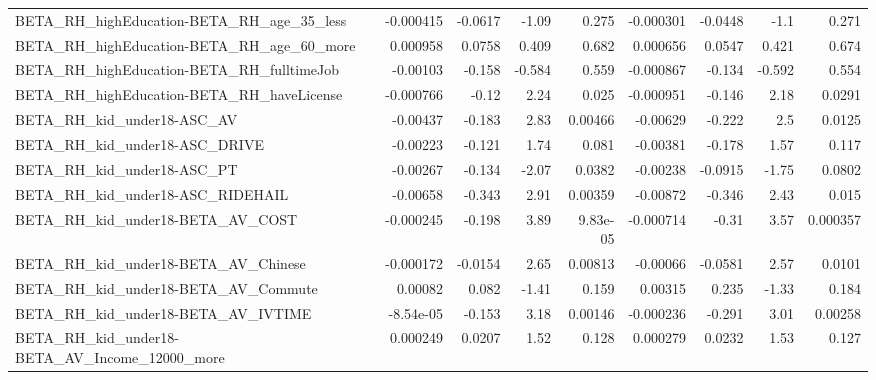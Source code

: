 \begin{tabular}{lrrrrrrrr}
BETA\_RH\_highEducation-BETA\_RH\_age\_35\_less          &   -0.000415 &      -0.0617 &    -1.09 &    0.275 &  -0.000301 &     -0.0448 &         -1.1 &         0.271 \\
BETA\_RH\_highEducation-BETA\_RH\_age\_60\_more          &    0.000958 &       0.0758 &    0.409 &    0.682 &   0.000656 &      0.0547 &        0.421 &         0.674 \\
BETA\_RH\_highEducation-BETA\_RH\_fulltimeJob          &    -0.00103 &       -0.158 &   -0.584 &    0.559 &  -0.000867 &      -0.134 &       -0.592 &         0.554 \\
BETA\_RH\_highEducation-BETA\_RH\_haveLicense          &   -0.000766 &        -0.12 &     2.24 &    0.025 &  -0.000951 &      -0.146 &         2.18 &        0.0291 \\
BETA\_RH\_kid\_under18-ASC\_AV                         &    -0.00437 &       -0.183 &     2.83 &  0.00466 &   -0.00629 &      -0.222 &          2.5 &        0.0125 \\
BETA\_RH\_kid\_under18-ASC\_DRIVE                      &    -0.00223 &       -0.121 &     1.74 &    0.081 &   -0.00381 &      -0.178 &         1.57 &         0.117 \\
BETA\_RH\_kid\_under18-ASC\_PT                         &    -0.00267 &       -0.134 &    -2.07 &   0.0382 &   -0.00238 &     -0.0915 &        -1.75 &        0.0802 \\
BETA\_RH\_kid\_under18-ASC\_RIDEHAIL                   &    -0.00658 &       -0.343 &     2.91 &  0.00359 &   -0.00872 &      -0.346 &         2.43 &         0.015 \\
BETA\_RH\_kid\_under18-BETA\_AV\_COST                   &   -0.000245 &       -0.198 &     3.89 & 9.83e-05 &  -0.000714 &       -0.31 &         3.57 &      0.000357 \\
BETA\_RH\_kid\_under18-BETA\_AV\_Chinese                &   -0.000172 &      -0.0154 &     2.65 &  0.00813 &   -0.00066 &     -0.0581 &         2.57 &        0.0101 \\
BETA\_RH\_kid\_under18-BETA\_AV\_Commute                &     0.00082 &        0.082 &    -1.41 &    0.159 &    0.00315 &       0.235 &        -1.33 &         0.184 \\
BETA\_RH\_kid\_under18-BETA\_AV\_IVTIME                 &   -8.54e-05 &       -0.153 &     3.18 &  0.00146 &  -0.000236 &      -0.291 &         3.01 &       0.00258 \\
BETA\_RH\_kid\_under18-BETA\_AV\_Income\_12000\_more      &    0.000249 &       0.0207 &     1.52 &    0.128 &   0.000279 &      0.0232 &         1.53 &         0.127 \\

\end{tabular}
